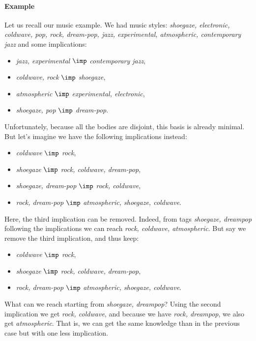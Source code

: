 \paragraph{Example} Let us recall our music example. We had music styles:
\textit{shoegaze, electronic, coldwave, pop, rock, dream-pop, jazz, 
experimental, atmospheric, contemporary jazz} and some implications:
\begin{itemize}
	\item[ ] \textit{jazz, experimental} $\imp$ \textit{contemporary jazz},
	\item[ ] \textit{coldwave, rock}  $\imp$ \textit{shoegaze},
	\item[ ] \textit{atmospheric} $\imp$ \textit{experimental, electronic},
	\item[ ] \textit{shoegaze, pop} $\imp$ \textit{dream-pop}.
\end{itemize}
\noindent Unfortunately, because all the bodies are disjoint, this basis is 
already minimal. But let's imagine we have the following implications instead:
\begin{itemize}
	\item[ ] \textit{coldwave} $\imp$ \textit{rock},
	\item[ ] \textit{shoegaze}  $\imp$ \textit{rock, coldwave, dream-pop},
	\item[ ] \textit{shoegaze, dream-pop} $\imp$ \textit{rock, coldwave},
	\item[ ] \textit{rock, dream-pop} $\imp$ \textit{atmospheric, shoegaze, 
	coldwave}.
\end{itemize}
\noindent Here, the third implication can be removed. Indeed, from tags 
\textit{shoegaze, dreampop} following the implications we can reach 
\textit{rock, coldwave, atmospheric}. But say we remove the third implication,
and thus keep:
\begin{itemize}
	\item[ ] \textit{coldwave} $\imp$ \textit{rock},
	\item[ ] \textit{shoegaze}  $\imp$ \textit{rock, coldwave, dream-pop},
	\item[ ] \textit{rock, dream-pop} $\imp$ \textit{atmospheric, shoegaze, 
	coldwave}.
\end{itemize}
What can we reach starting from \textit{shoegaze, dreampop}? Using the second
implication we get \textit{rock, coldwave}, and because we have \textit{rock, 
dreampop}, we also get \textit{atmospheric}. That is, we can get the same 
knowledge than in the previous case but with one less implication.

